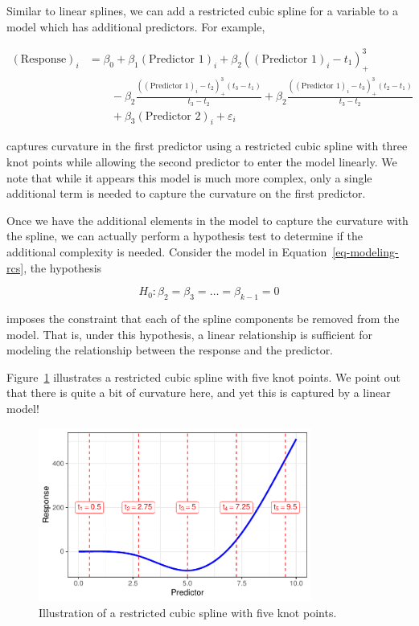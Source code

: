 \documentclass[
  letterpaper,
  DIV=11,
  numbers=noendperiod]{scrreprt}
\theoremstyle{definition}
\theoremstyle{definition}
\theoremstyle{remark}
\begin{document}
Similar to linear splines, we can add a restricted cubic spline for a
variable to a model which has additional predictors. For example,

\[
\begin{aligned}
(\text{Response})_i 
  &= \beta_0 + \beta_1 (\text{Predictor 1})_i + \beta_2 \left((\text{Predictor 1})_i - t_1\right)_+^3 \\
  &\qquad - \beta_2 \frac{\left((\text{Predictor 1})_i - t_2\right)_+^3 \left(t_3 - t_1\right)}{t_3 - t_2} + \beta_2 \frac{\left((\text{Predictor 1})_i - t_3\right)_+^3 \left(t_2 - t_1\right)}{t_3 - t_2} \\
  &\qquad + \beta_3 (\text{Predictor 2})_i + \varepsilon_i
\end{aligned}
\]

captures curvature in the first predictor using a restricted cubic
spline with three knot points while allowing the second predictor to
enter the model linearly. We note that while it appears this model is
much more complex, only a single additional term is needed to capture
the curvature on the first predictor.

Once we have the additional elements in the model to capture the
curvature with the spline, we can actually perform a hypothesis test to
determine if the additional complexity is needed. Consider the model in
Equation~\ref{eq-modeling-rcs}, the hypothesis

\[H_0: \beta_2 = \beta_3 = \dotsc = \beta_{k-1} = 0\]

imposes the constraint that each of the spline components be removed
from the model. That is, under this hypothesis, a linear relationship is
sufficient for modeling the relationship between the response and the
predictor.

Figure~\ref{fig-modeling-splines-rcs} illustrates a restricted cubic
spline with five knot points. We point out that there is quite a bit of
curvature here, and yet this is captured by a linear model!

\begin{figure}

{\centering \includegraphics[width=0.8\textwidth,height=\textheight]{./images/fig-modeling-splines-rcs-1.pdf}

}

\caption{\label{fig-modeling-splines-rcs}Illustration of a restricted
cubic spline with five knot points.}

\end{figure}
\end{document}
